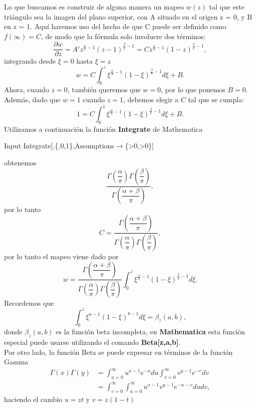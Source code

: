 Lo que buscamos es construir de alguna manera un mapeo $w(z)$ tal que este triángulo sea la imagen del plano superior, con A situado en el origen z = 0, y B en z = 1. Aquí haremos uso del hecho de que C puede ser definido como $f(\infty)=C$, de modo que la fórmula \SC \; solo involucre dos términos:
$$\dfrac{\partial w}{\partial z}=A' z^{\frac{\alpha}{\pi}-1}(z-1)^{\frac{\beta}{\pi}-1}=Cz^{\frac{\alpha}{\pi}-1}(1-z)^{\frac{\beta}{\pi}-1},$$
integrando desde $\xi=0$ hasta $\xi=z$
$$w=C\int_{0}^{z}\xi^{\frac{\alpha}{\pi}-1}(1-\xi)^{\frac{\beta}{\pi}-1}d\xi+B.$$
Ahora, cuando $z = 0$, también queremos que $w = 0$, por lo que ponemos $B = 0$. Además, dado que $w = 1$ cuando $z = 1$, debemos elegir a $C$ tal que se cumpla:
$$1=C\int_{0}^{1}\xi^{\frac{\alpha}{\pi}-1}(1-\xi)^{\frac{\beta}{\pi}-1}d\xi+B.$$
Utilizamos a continuación la función \textbf{Integrate} de Mathematica
\begin{mmaCell}{Input}
	 Integrate[,\{\mmaFnc{\(\pmb{\xi}\)},0,1\},Assumptions\(\pmb{\to}\)\{\mmaUnd{\(\pmb{\alpha}\)}>0,\mmaUnd{\(\pmb{\beta}\)}>0\}]
\end{mmaCell}
obtenemos
$$\dfrac{\Gamma\left(\dfrac{\alpha}{\pi}\right)\Gamma\left(\dfrac{\beta}{\pi}\right)}{\Gamma\left(\dfrac{\alpha+\beta}{\pi}\right)},$$
por lo tanto 
$$C=\dfrac{\Gamma\left(\dfrac{\alpha+\beta}{\pi}\right)}{\Gamma\left(\dfrac{\alpha}{\pi}\right)\Gamma\left(\dfrac{\beta}{\pi}\right)},$$
por lo tanto el mapeo viene dado por 
\begin{equation}
	w=\dfrac{\Gamma\left(\dfrac{\alpha+\beta}{\pi}\right)}{\Gamma\left(\dfrac{\alpha}{\pi}\right)\Gamma\left(\dfrac{\beta}{\pi}\right)}\int_{0}^{z}\xi^{\frac{\alpha}{\pi}-1}(1-\xi)^{\frac{\beta}{\pi}-1}d\xi.
\end{equation}
Recordemos que  $$\int_{0}^{z}\xi^{a-1}(1-\xi)^{b-1}d\xi = \beta_z(a,b),$$
donde $\beta_z(a,b)$ es la función beta incompleta, en \textbf{Mathematica} esta función especial puede usarse utilizando el comando \textbf{Beta[z,a,b]}.\\
Por otro lado, la función Beta se puede expresar en términos de la función Gamma
\[
{\displaystyle {\begin{aligned}\Gamma (x)\Gamma (y)&=\int _{u=0}^{\infty }u^{x-1}e^{-u}du\int _{v=0}^{\infty }v^{y-1}e^{-v}dv\\&=\int _{v=0}^{\infty }\int _{u=0}^{\infty }u^{x-1}v^{y-1}e^{-u-v}dudv,\end{aligned}}}
\]
haciendo el cambio $u=zt$ y $v=z(1-t)$


